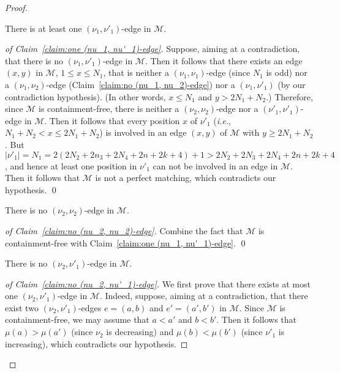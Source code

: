 \documentclass[a4paper,10pt]{llncs}
\begin{document}
\begin{proof}
  \begin{claim}
    \label{claim:one (nu_1, nu'_1)-edge}
    There is at least one $(\nu_1, \nu'_1)$-edge in $\mathcal{M}$.
  \end{claim}

  \begin{proof}[of Claim~\ref{claim:one (nu_1, nu'_1)-edge}]
    Suppose, aiming at a contradiction, that there is no
    $(\nu_1, \nu'_1)$-edge in $\mathcal{M}$.
    Then it follows that there exists an edge $(x, y)$ in $\mathcal{M}$,
    $1 \leq x \leq N_1$, that is neither a
    $(\nu_1, \nu_1)$-edge (since $N_1$ is odd)
    nor a $(\nu_1, \nu_2)$-edge (Claim~\ref{claim:no (nu_1, nu_2)-edge})
    nor a $(\nu_1, \nu'_1)$ (by our contradiction hypothesis).
    (In other words, $x \leq N_1$ and $y > 2N_1 + N_2$.)
    Therefore, since $\mathcal{M}$ is containment-free,
    there is neither a $(\nu_2, \nu_2)$-edge nor a $(\nu'_1, \nu'_1)$-edge
    in $\mathcal{M}$.
    Then it follows that every position $x$ of $\nu'_1$
    (\emph{i.e.}, $N_1+N_2 < x \leq 2N_1+N_2$)
    is involved in an edge $(x, y)$ of $\mathcal{M}$ with $y \geq 2N_1+N_2$.
    But $|\nu'_1| = N_1 = 2(2N_2 + 2n_3 + 2N_4 + 2n + 2k + 4) + 1
    > 2N_2 + 2N_3 + 2N_4 + 2n + 2k + 4$, and hence at least one
    position in $\nu'_1$ can not be involved in an edge in $\mathcal{M}$.
    Then it follows that $\mathcal{M}$ is not a perfect matching,
    which contradicts our hypothesis.
    \qed
  \end{proof}

  \begin{claim}
    \label{claim:no (nu_2, nu_2)-edge}
    There is no $(\nu_2, \nu_2)$-edge in $\mathcal{M}$.
  \end{claim}

  \begin{proof}[of Claim~\ref{claim:no (nu_2, nu_2)-edge}]
  Combine the fact that $\mathcal{M}$ is containment-free with
  Claim~\ref{claim:one (nu_1, nu'_1)-edge}.
  \qed
  \end{proof}

  \begin{claim}
    \label{claim:no (nu_2, nu'_1)-edge}
    There is no $(\nu_2, \nu'_1)$-edge in $\mathcal{M}$.
  \end{claim}

  \begin{proof}[of Claim~\ref{claim:no (nu_2, nu'_1)-edge}]
    We first prove that there exists at most one
    $(\nu_2, \nu'_1)$-edge in $\mathcal{M}$.
    Indeed, suppose, aiming at a contradiction, that there exist
    two $(\nu_2, \nu'_1)$-edges $e = (a, b)$ and $e' = (a', b')$ in $\mathcal{M}$.
    Since $\mathcal{M}$ is containment-free,
    we may assume that $a < a'$ and $b < b'$.
    Then it follows that $\mu(a) > \mu(a')$
    (since $\nu_2$ is decreasing) and $\mu(b) < \mu(b')$
    (since $\nu'_1$ is increasing),
    which contradicts our hypothesis.


\end{proof}
\end{proof}
\end{document}
